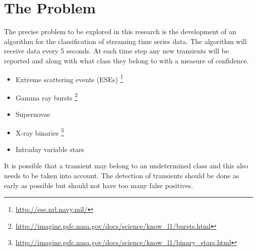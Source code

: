 \section{The Problem}
	The precise problem to be explored in this research is the development of an algorithm for the classification of streaming time series data. The algorithm will receive data every 5 seconds. At each time step any new transients will be reported and along with what class they belong to with a measure of confidence.
		\begin{itemize}
		\item Extreme scattering events (ESEs) \footnote{\url{http://ese.nrl.navy.mil/}}
		\item Gamma ray bursts \footnote{\url{http://imagine.gsfc.nasa.gov/docs/science/know_l1/bursts.html}}
		\item Supernovae
		\item X-ray binaries \footnote{\url{http://imagine.gsfc.nasa.gov/docs/science/know_l1/binary_stars.html}}
		\item Intraday variable stars
	\end{itemize}
	It is possible that a transient may belong to an undetermined class and this also needs to be taken into account. The detection of transients should be done as early as possible but should not have too many false positives.
	
